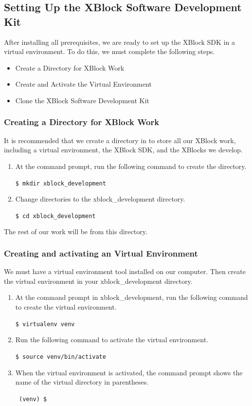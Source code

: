 \subsection{Setting Up the XBlock Software Development Kit}
After installing all prerequisites, we are ready to set up the XBlock SDK in a virtual environment.
To do this, we must complete the following steps.
\begin{itemize}
\item Create a Directory for XBlock Work
\item Create and Activate the Virtual Environment
\item Clone the XBlock Software Development Kit
\end{itemize}
\subsubsection{Creating a Directory for XBlock Work}
It is recommended that we create a directory in to store all our XBlock work, including a
virtual environment, the XBlock SDK, and the XBlocks we develop.
\begin{enumerate}
\item At the command prompt, run the following command to create the directory.
\begin{center}\verb=$ mkdir xblock_development=\end{center}
\item Change directories to the xblock\_development directory.
\begin{center}\verb=$ cd xblock_development=\end{center}
\end{enumerate}
The rest of our work will be from this directory.

\subsubsection{Creating and activating an Virtual Environment}
We must have a virtual environment tool installed on our computer. Then create the virtual
environment in your xblock\_development directory.
\begin{enumerate}
\item At the command prompt in xblock\_development, run the following command to
create the virtual environment.
\begin{center}\verb=$ virtualenv venv=\end{center}
\item Run the following command to activate the virtual environment.
\begin{center}\verb=$ source venv/bin/activate=\end{center}
\item When the virtual environment is activated, the command prompt shows the name of
the virtual directory in parentheses.
\begin{center}\verb= (venv) $=\end{center}
\end{enumerate}



